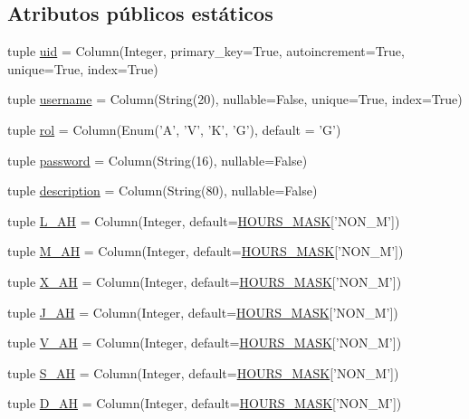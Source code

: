 \subsection*{Atributos públicos estáticos}
\begin{DoxyCompactItemize}
\item 
tuple \hyperlink{classdb__layer_1_1_user_aaf892db2c6e38a461364db0e751b9f63}{uid} = Column(Integer, primary\-\_\-key=True, autoincrement=True, unique=True, index=True)
\item 
tuple \hyperlink{classdb__layer_1_1_user_a096c898547257a09c296dd25a6625ff0}{username} = Column(String(20), nullable=False, unique=True, index=True)
\item 
tuple \hyperlink{classdb__layer_1_1_user_ae4e4cc108d1b9fcb54c93f28d8c04cce}{rol} = Column(Enum('A', 'V', 'K', 'G'), default = 'G')
\item 
tuple \hyperlink{classdb__layer_1_1_user_ae6293d034b011b8ff8c7c0d77d914ab6}{password} = Column(String(16), nullable=False)
\item 
tuple \hyperlink{classdb__layer_1_1_user_af10568688235c01f6244aebc285192a7}{description} = Column(String(80), nullable=False)
\item 
tuple \hyperlink{classdb__layer_1_1_user_a3746b030cfe8c68de00434e7f7aa55e8}{L\-\_\-\-A\-H} = Column(Integer, default=\hyperlink{namespacedb__layer_ad6ee299a7034867156fb8100ec6864d7}{H\-O\-U\-R\-S\-\_\-\-M\-A\-S\-K}\mbox{[}'N\-O\-N\-\_\-\-M'\mbox{]})
\item 
tuple \hyperlink{classdb__layer_1_1_user_aca612c160e61b610ecb37dd55b83f528}{M\-\_\-\-A\-H} = Column(Integer, default=\hyperlink{namespacedb__layer_ad6ee299a7034867156fb8100ec6864d7}{H\-O\-U\-R\-S\-\_\-\-M\-A\-S\-K}\mbox{[}'N\-O\-N\-\_\-\-M'\mbox{]})
\item 
tuple \hyperlink{classdb__layer_1_1_user_ada11ed7b535bdb0eb30e2e48c0cd5e8a}{X\-\_\-\-A\-H} = Column(Integer, default=\hyperlink{namespacedb__layer_ad6ee299a7034867156fb8100ec6864d7}{H\-O\-U\-R\-S\-\_\-\-M\-A\-S\-K}\mbox{[}'N\-O\-N\-\_\-\-M'\mbox{]})
\item 
tuple \hyperlink{classdb__layer_1_1_user_ad76a60aa40532d858fc7c47cc8ccfc6d}{J\-\_\-\-A\-H} = Column(Integer, default=\hyperlink{namespacedb__layer_ad6ee299a7034867156fb8100ec6864d7}{H\-O\-U\-R\-S\-\_\-\-M\-A\-S\-K}\mbox{[}'N\-O\-N\-\_\-\-M'\mbox{]})
\item 
tuple \hyperlink{classdb__layer_1_1_user_a52dcce70c5f6169a4edec3033868281c}{V\-\_\-\-A\-H} = Column(Integer, default=\hyperlink{namespacedb__layer_ad6ee299a7034867156fb8100ec6864d7}{H\-O\-U\-R\-S\-\_\-\-M\-A\-S\-K}\mbox{[}'N\-O\-N\-\_\-\-M'\mbox{]})
\item 
tuple \hyperlink{classdb__layer_1_1_user_a612925ca4a2496400fcdd7b6634ff812}{S\-\_\-\-A\-H} = Column(Integer, default=\hyperlink{namespacedb__layer_ad6ee299a7034867156fb8100ec6864d7}{H\-O\-U\-R\-S\-\_\-\-M\-A\-S\-K}\mbox{[}'N\-O\-N\-\_\-\-M'\mbox{]})
\item 
tuple \hyperlink{classdb__layer_1_1_user_a59e61bc39bfe07f6d3b4dfd06fa95262}{D\-\_\-\-A\-H} = Column(Integer, default=\hyperlink{namespacedb__layer_ad6ee299a7034867156fb8100ec6864d7}{H\-O\-U\-R\-S\-\_\-\-M\-A\-S\-K}\mbox{[}'N\-O\-N\-\_\-\-M'\mbox{]})
\end{DoxyCompactItemize}


